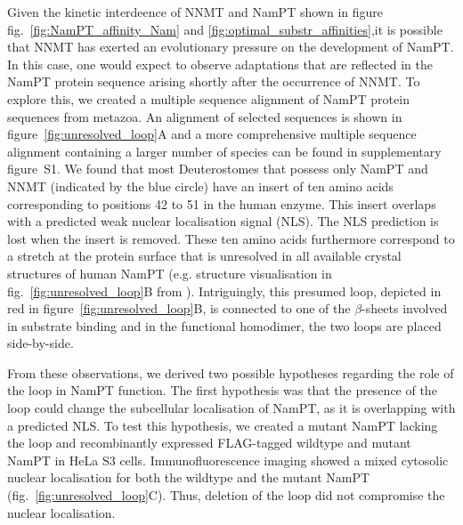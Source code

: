 Given the kinetic interdeence of  NNMT and NamPT shown in figure fig.~\ref{fig:NamPT_affinity_Nam} and \ref{fig:optimal_substr_affinities},it is possible that NNMT has exerted an evolutionary pressure on the development of NamPT. In this case, one would expect to observe adaptations that are reflected in the NamPT protein sequence arising shortly after the occurrence of NNMT. To explore this, we created a multiple sequence alignment of NamPT protein sequences from metazoa. An alignment of selected sequences is shown in figure~\ref{fig:unresolved_loop}A and a more comprehensive multiple sequence alignment containing a larger number of species can be found in supplementary figure~S1. We found that most Deuterostomes that possess only NamPT and NNMT (indicated by the blue circle) have an insert of ten amino acids corresponding to positions 42 to 51 in the human enzyme. This insert overlaps with a predicted weak nuclear localisation signal (NLS). The NLS prediction is lost when the insert is removed. These ten amino acids furthermore correspond to a stretch at the protein surface that is unresolved in all available crystal structures of human NamPT (e.g. structure visualisation in fig.~\ref{fig:unresolved_loop}B from \cite{Wang2006}). Intriguingly, this presumed loop, depicted in red in figure~\ref{fig:unresolved_loop}B, is connected to one of the $\beta$-sheets involved in substrate binding \cite{Burgos2009} and in the functional homodimer, the two loops are placed side-by-side.

From these observations, we derived two possible hypotheses regarding the role of the loop in NamPT function. The first hypothesis was that the presence of the loop could change the subcellular localisation of NamPT, as it is overlapping with a predicted NLS. To test this hypothesis, we created a mutant NamPT lacking the loop and recombinantly expressed FLAG-tagged wildtype and mutant NamPT in HeLa S3 cells. Immunofluorescence imaging showed a mixed cytosolic nuclear localisation for both the wildtype and the mutant NamPT (fig.~\ref{fig:unresolved_loop}C). Thus, deletion of the loop did not compromise the nuclear localisation.

